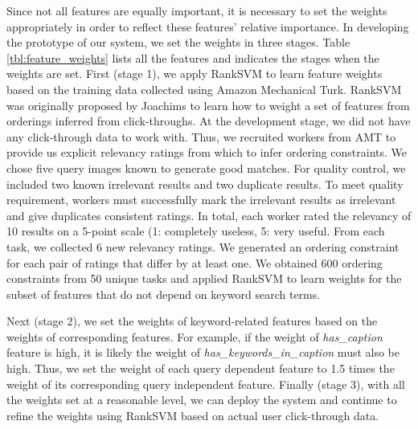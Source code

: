\documentclass{www2010-submission}
\begin{document}
Since not all features are equally important, it is necessary to set
the weights appropriately in order to reflect these features' relative
importance. In developing the prototype of our system, we set the
weights in three stages. Table \ref{tbl:feature_weights} lists all the
features and indicates the stages when the weights are set. First
(stage 1), we apply RankSVM to learn feature weights based on the
training data collected using Amazon Mechanical Turk. RankSVM was
originally proposed by Joachims \cite{Joachims} to learn how to weight
a set of features from orderings inferred from click-throughs. At the
development stage, we did not have any click-through data to work
with. Thus, we recruited workers from AMT to provide us explicit
relevancy ratings from which to infer ordering constraints. We chose
five query images known to generate good matches. For quality
control, we included two known irrelevant results and two duplicate
results. To meet quality requirement, workers must successfully
mark the irrelevant results as irrelevant and give duplicates
consistent ratings. In total, each worker rated the
relevancy of 10 results on a 5-point scale (1: completely useless, 5:
very useful. From each task, we collected 6 new relevancy ratings. We
generated an ordering constraint for each pair of ratings that differ
by at least one. We obtained 600 ordering constraints from 50 unique
tasks and applied RankSVM to learn weights for the subset of features
that do not depend on keyword search terms.

Next (stage 2), we set the weights of keyword-related features based
on the weights of corresponding features. For example, if the weight
of \emph{has\_caption} feature is high, it is likely the weight of
\emph{has\_keywords\_in\_caption} must also be high. Thus, we set the
weight of each query dependent feature to 1.5 times the weight of its
corresponding query independent feature. Finally (stage 3), with all
the weights set at a reasonable level, we can deploy the system and
continue to refine the weights using RankSVM based on actual user
click-through data.
\end{document}
